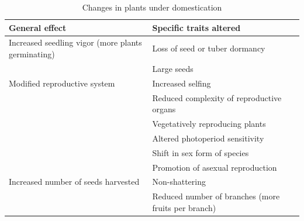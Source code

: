 \documentclass[ignorenonframetext,aspectratio=169]{beamer}
\begin{document}
\begin{frame}{}
\protect\hypertarget{section-3}{}

\begin{table}[t]

\caption{\label{tab:domestication-syndrome}Changes in plants under domestication}
\centering
\fontsize{6}{8}\selectfont
\begin{tabular}{>{\raggedright\arraybackslash}p{16em}>{\raggedright\arraybackslash}p{40em}}
\toprule
General effect & Specific traits altered\\
\midrule
\rowcolor{gray!6}  Increased seedling vigor (more plants germinating) & Loss of seed or tuber dormancy\\
 & Large seeds\\
\rowcolor{gray!6}  Modified reproductive system & Increased selfing\\
 & Reduced complexity of reproductive organs\\
\rowcolor{gray!6}   & Vegetatively reproducing plants\\
\addlinespace
 & Altered photoperiod sensitivity\\
\rowcolor{gray!6}   & Shift in sex form of species\\
 & Promotion of asexual reproduction\\
\rowcolor{gray!6}  Increased number of seeds harvested & Non-shattering\\
 & Reduced number of branches (more fruits per branch)\\
\bottomrule
\end{tabular}
\end{table}

\end{frame}
\end{document}
